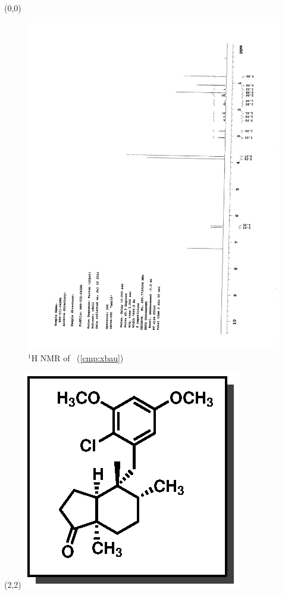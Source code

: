 \begin{textblock}{20}(0,0)
\begin{figure}[htb]
\caption{$^1$H NMR of \CMPxbau\ (\ref{cmp:xbau})}
\includegraphics[scale=0.75, trim = 0mm 0mm 0mm 5mm,
clip]{chp_singlecarbon/images/nmr/xbauH}
\vspace{-100pt}
\end{figure}
\end{textblock}
\begin{textblock}{1}(2,2)
\includegraphics[scale=0.8, angle=90]{chp_singlecarbon/images/xbau}
\end{textblock}
